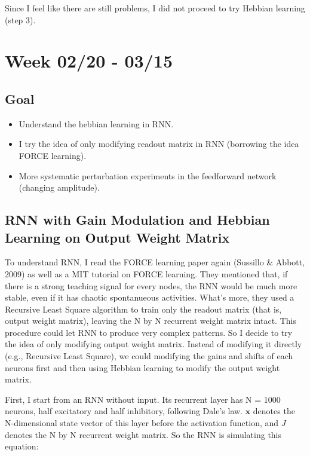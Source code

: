 \documentclass[12pt, a4paper]{article}
\begin{document}
Since I feel like there are still problems, I did not proceed to try Hebbian learning (step 3). 

\newpage


\section*{Week 02/20 - 03/15}

\subsection*{Goal}

\noindent
\begin{itemize}
    \item Understand the hebbian learning in RNN.
    \item I try the idea of only modifying readout matrix in RNN (borrowing the idea FORCE learning).
    \item More systematic perturbation experiments in the feedforward network (changing amplitude).

\end{itemize}

\newpage

\subsection*{RNN with Gain Modulation and Hebbian Learning on Output Weight Matrix}

To understand RNN, I read the FORCE learning paper again (Sussillo \& Abbott, 2009) as well as a MIT tutorial on FORCE learning. They mentioned that, if there is a strong teaching signal for every nodes, the RNN would be much more stable, even if it has chaotic spontanueous activities. What's more, they used a Recursive Least Square algorithm to train only the readout matrix (that is, output weight matrix), leaving the N by N recurrent weight matrix intact. This procedure could let RNN to produce very complex patterns. So I decide to try the idea of only modifying output weight matrix. Instead of modifying it directly (e.g., Recursive Least Square), we could modifying the gains and shifts of each neurons first and then using Hebbian learning to modify the output weight matrix.

First, I start from an RNN without input. Its recurrent layer has N = 1000 neurons, half excitatory and half inhibitory, following Dale's law. $\mathbf{x}$ denotes the N-dimensional state vector of this layer before the activation function, and $J$ denotes the N by N recurrent weight matrix. So the RNN is simulating this equation:
\end{document}
